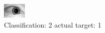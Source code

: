 \begin{figure}[h!]
\begin{center}
\includegraphics[width=0.60\columnwidth]{figures/ID1487_class_2_target_1.png}
\end{center}
\caption{ Classification: 2 actual target: 1}
\label{fig:ID1487_class_2_target_1}
\end{figure}
